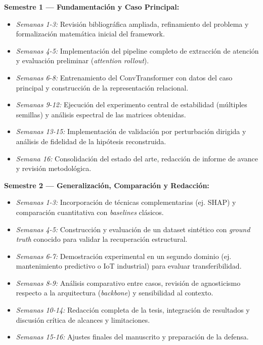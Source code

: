 \documentclass[12pt,letterpaper]{article}
\begin{document}
\vspace{0.3cm}
\textbf{Semestre 1 --- Fundamentación y Caso Principal:}
\begin{itemize}[leftmargin=*, itemsep=0pt]
    \item \textit{Semanas 1-3:} Revisión bibliográfica ampliada, refinamiento del problema y formalización matemática inicial del framework.
    \item \textit{Semanas 4-5:} Implementación del pipeline completo de extracción de atención y evaluación preliminar (\textit{attention rollout}).
    \item \textit{Semanas 6-8:} Entrenamiento del ConvTransformer con datos del caso principal y construcción de la representación relacional.
    \item \textit{Semanas 9-12:} Ejecución del experimento central de estabilidad (múltiples semillas) y análisis espectral de las matrices obtenidas.
    \item \textit{Semanas 13-15:} Implementación de validación por perturbación dirigida y análisis de fidelidad de la hipótesis reconstruida.
    \item \textit{Semana 16:} Consolidación del estado del arte, redacción de informe de avance y revisión metodológica.
\end{itemize}

\vspace{0.3cm}
\textbf{Semestre 2 --- Generalización, Comparación y Redacción:}
\begin{itemize}[leftmargin=*, itemsep=0pt]
    \item \textit{Semanas 1-3:} Incorporación de técnicas complementarias (ej. SHAP) y comparación cuantitativa con \textit{baselines} clásicos.
    \item \textit{Semanas 4-5:} Construcción y evaluación de un dataset sintético con \textit{ground truth} conocido para validar la recuperación estructural.
    \item \textit{Semanas 6-7:} Demostración experimental en un segundo dominio (ej. mantenimiento predictivo o IoT industrial) para evaluar transferibilidad.
    \item \textit{Semanas 8-9:} Análisis comparativo entre casos, revisión de agnosticismo respecto a la arquitectura (\textit{backbone}) y sensibilidad al contexto.
    \item \textit{Semanas 10-14:} Redacción completa de la tesis, integración de resultados y discusión crítica de alcances y limitaciones.
    \item \textit{Semanas 15-16:} Ajustes finales del manuscrito y preparación de la defensa.
\end{itemize}
\end{document}
